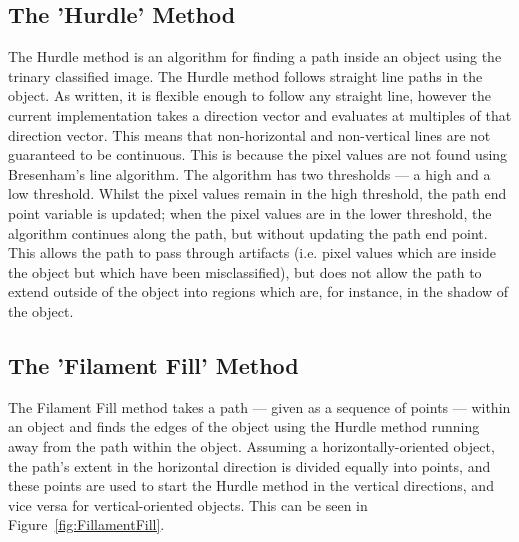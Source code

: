 \subsection{The 'Hurdle' Method}\label{sec:HurdleMethod}
The Hurdle method is an algorithm for finding a path inside an object using the trinary classified image. The Hurdle method follows straight line paths in the object. As written, it is flexible enough to follow any straight line, however the current implementation takes a direction vector and evaluates at multiples of that direction vector. This means that non-horizontal and non-vertical lines are not guaranteed to be continuous. This is because the pixel values are not found using Bresenham's line algorithm. The algorithm has two thresholds --- a high and a low threshold. Whilst the pixel values remain in the high threshold, the path end point variable is updated; when the pixel values are in the lower threshold, the algorithm continues along the path, but without updating the path end point. This allows the path to pass through artifacts (i.e. pixel values which are inside the object but which have been misclassified), but does not allow the path to extend outside of the object into regions which are, for instance, in the shadow of the object.
 
\subsection{The 'Filament Fill' Method}\label{sec:FilamentFill}
The Filament Fill method takes a path --- given as a sequence of points --- within an object and finds the edges of the object using the Hurdle method running away from the path within the object. Assuming a horizontally-oriented object, the path's extent in the horizontal direction is divided equally into points, and these points are used to start the Hurdle method in the vertical directions, and vice versa for vertical-oriented objects. This can be seen in Figure~\ref{fig:FillamentFill}.


